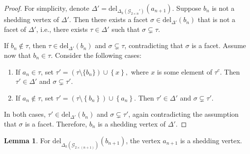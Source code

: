 \documentclass[11pt,reqno,a4paper]{amsart}
\theoremstyle{definition}
\theoremstyle{theorem}
\newtheorem{lemma}[theorem]{Lemma}
\newcommand{\kcut}{\Delta_{k}}
\newcommand{\twoggn}{\mathcal{G}_{2\times \left(n+1\right)}}
\newcommand{\twoggp}{\mathcal{G}_{2\times n}'}
\newcommand{\lno}{\left(}
\newcommand{\rno}{\right)}
\newcommand{\lcu}{\left\{}
\newcommand{\rcu}{\right\}}
\newcommand{\del}{\mathrm{del}}
\theoremstyle{remark}
\begin{document}
	\begin{proof}
		For simplicity, denote $\Delta' = \del_{\kcut\lno \twoggp \rno}\lno a_{n+1} \rno$. 
		Suppose $b_n$ is not a shedding vertex of $\Delta'$. Then there exists a facet $\sigma \in \del_{\Delta'}\lno b_n \rno$ that is not a facet of $\Delta'$, i.e., there exists $\tau \in \Delta'$ such that 
		$\sigma \subsetneq \tau$.
		
		If $b_n \notin \tau$, then $\tau \in \del_{\Delta'}\lno b_n \rno$ and 
		$\sigma \subsetneq \tau$, contradicting that $\sigma$ is a facet. 
		Assume now that $b_n \in \tau$. Consider the following cases:
		
		\begin{enumerate}[label=\arabic*.]
			\item If $a_n \in \tau$, set $\tau' = \lno \tau \setminus \{b_n\} \rno \cup \lcu x \rcu,$ where $x$ is some element of $\tau^c$. Then $\tau' \in \Delta'$ and $\sigma \subsetneq \tau'$.
			
			\item If $a_n \notin \tau$, set $\tau' = \lno \tau \setminus \lcu b_n \rcu \rno \cup \lcu a_n \rcu.$ 
			Then $\tau' \in \Delta'$ and $\sigma \subsetneq \tau'$.
		\end{enumerate}
		
		In both cases, $\tau' \in \del_{\Delta'}\lno b_n \rno$ and $\sigma \subsetneq \tau'$, again contradicting the assumption that $\sigma$ is a facet. Therefore, $b_n$ is a shedding vertex of $\Delta'$.
	\end{proof}
	
	
	\begin{lemma}\label{lemma: a_n+1 is shedding vertex of del(b_n+1)}
		For $\del_{\kcut\lno \twoggn \rno}\lno b_{n+1} \rno$, the vertex $a_{n+1}$ is a shedding vertex.
	\end{lemma}
	
\end{document}
